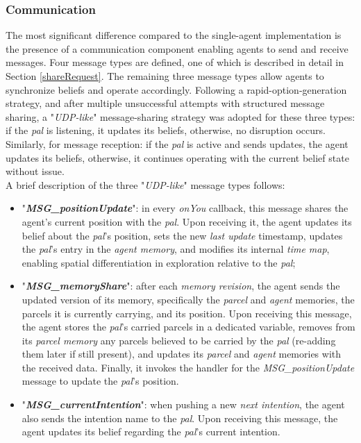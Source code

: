             
        \subsubsection{Communication}            
            The most significant difference compared to the single-agent implementation is the presence of a communication component enabling agents to send and receive messages. Four message types are defined, one of which is described in detail in Section \ref{shareRequest}. The remaining three message types allow agents to synchronize beliefs and operate accordingly. Following a rapid-option-generation strategy, and after multiple unsuccessful attempts with structured message sharing, a "\textit{UDP-like}" message-sharing strategy was adopted for these three types: if the \textit{pal} is listening, it updates its beliefs, otherwise, no disruption occurs. Similarly, for message reception: if the \textit{pal} is active and sends updates, the agent updates its beliefs, otherwise, it continues operating with the current belief state without issue.
            \medskip\\
            A brief description of the three "\textit{UDP-like}" message types follows:
            \begin{itemize}
                \item "\textbf{\textit{MSG\_positionUpdate}}": in every \textit{onYou} callback, this message shares the agent's current position with the \textit{pal}. Upon receiving it, the agent updates its belief about the \textit{pal}'s position, sets the new \textit{last update} timestamp, updates the \textit{pal}'s entry in the \textit{agent memory}, and modifies its internal \textit{time map}, enabling spatial differentiation in exploration relative to the \textit{pal};                    
                \item "\textbf{\textit{MSG\_memoryShare}}": after each \textit{memory revision}, the agent sends the updated version of its memory, specifically the \textit{parcel} and \textit{agent} memories, the parcels it is currently carrying, and its position. Upon receiving this message, the agent stores the \textit{pal}'s carried parcels in a dedicated variable, removes from its \textit{parcel memory} any parcels believed to be carried by the \textit{pal} (re-adding them later if still present), and updates its \textit{parcel} and \textit{agent} memories with the received data. Finally, it invokes the handler for the \textit{MSG\_positionUpdate} message to update the \textit{pal}'s position.
                \item "\textbf{\textit{MSG\_currentIntention}}": when pushing a new \textit{next intention}, the agent also sends the intention name to the \textit{pal}. Upon receiving this message, the agent updates its belief regarding the \textit{pal}'s current intention.
            \end{itemize}
            
